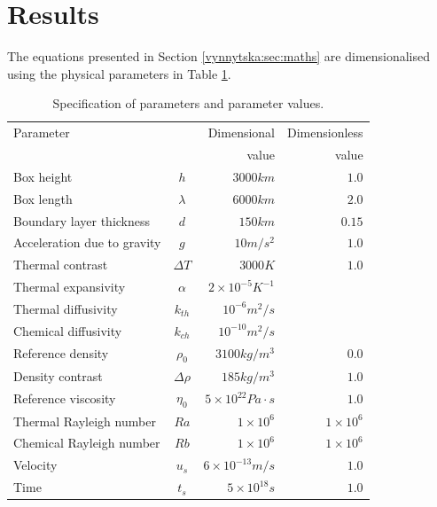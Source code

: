 
\section{Results}
\label{vynnytska:sec:results}

The equations presented in Section \ref{vynnytska:sec:maths} are
dimensionalised using the physical parameters in
Table \ref{vynnytska:table:variables}.
\begin{table}[htbp]
\caption{Specification of parameters and parameter values.}
  \begin{tabular}{l c r r}
    Parameter & & Dimensional  & Dimensionless  \\
              &  & value & value\\
    \toprule
    Box height & $h$ & $3000km$ & $1.0$\\
    Box length & $\lambda$ & $6000km$ & $2.0$ \\
    Boundary layer thickness & $d$ & $150km$ & $0.15$ \\
    Acceleration due to gravity & $g$ & $10m/s^2$ & $1.0$ \\
    Thermal contrast & $\Delta T$ & $3000K$ & $1.0$ \\
    Thermal expansivity & $\alpha$ & $2 \times 10^{-5}K^{-1}$ & \\
    Thermal diffusivity & $k_{th}$ & $10^{-6}m^{2}/s$ & \\
    Chemical diffusivity & $k_{ch}$ & $10^{-10}m^{2}/s$ & \\
    Reference density & $\rho_{0}$ & $3100kg/m^{3}$ & $0.0$ \\
    Density contrast & $\Delta \rho $ & $185kg/m^{3}$ & $1.0$ \\
    Reference viscosity & $\eta_{0}$ & $5 \times 10^{22} Pa \cdot s$ & $1.0$ \\
    Thermal Rayleigh number & $Ra$ & $1 \times 10^{6}$ & $ 1 \times 10^{6}$\\
    Chemical Rayleigh number & $Rb$ & $1 \times 10^{6}$ & $1 \times 10^{6}$\\
    Velocity & $u_s$ & $6 \times 10^{-13} m/s$& $1.0$ \\
    Time & $t_s$ & $5 \times 10^{18} s$& $1.0$ \\
    \bottomrule
\end{tabular}
\label{vynnytska:table:variables}
\end{table}

